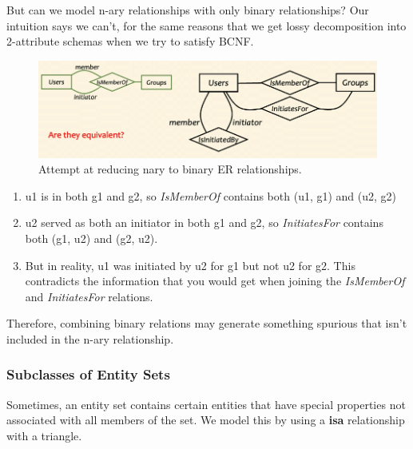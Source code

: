 \documentclass{article}
\begin{document}
      But can we model n-ary relationships with only binary relationships? Our intuition says we can't, for the same reasons that we get lossy decomposition into 2-attribute schemas when we try to satisfy BCNF. 
      \begin{figure}[H]
        \centering 
        \includegraphics[scale=0.4]{img/nary_vs_binary.png}
        \caption{Attempt at reducing nary to binary ER relationships. } 
        \label{fig:}
      \end{figure}
      \begin{enumerate}
        \item u1 is in both g1 and g2, so \textit{IsMemberOf} contains both (u1, g1) and (u2, g2)
        \item u2 served as both an initiator in both g1 and g2, so \textit{InitiatesFor} contains both (g1, u2) and (g2, u2). 
        \item But in reality, u1 was initiated by u2 for g1 but not u2 for g2. This contradicts the information that you would get when joining the \textit{IsMemberOf} and \textit{InitiatesFor} relations. 
      \end{enumerate}
      Therefore, combining binary relations may generate something spurious that isn't included in the n-ary relationship. 

    \subsubsection{Subclasses of Entity Sets}

      Sometimes, an entity set contains certain entities that have special properties not associated with all members of the set. We model this by using a \textbf{isa} relationship with a triangle. 
      
\end{document}
